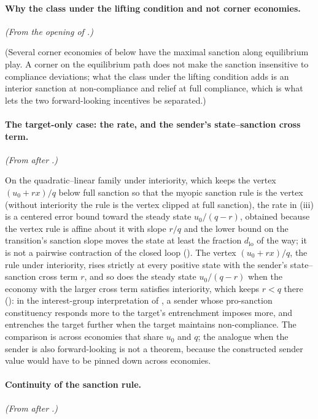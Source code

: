 \paragraph{Why the class under the lifting condition and not corner economies.} \emph{(From the opening of .)}

(Several corner economies of
 below have the maximal sanction along
equilibrium play. A corner on the equilibrium path does not make the
sanction insensitive to compliance deviations; what the class under the lifting condition adds
is an interior sanction at non-compliance and relief at full compliance,
which is what lets the two forward-looking incentives be separated.) 

\paragraph{The target-only case: the rate, and the sender's state--sanction cross term.} \emph{(From after .)}

On the quadratic--linear family under interiority, which keeps the vertex
$(u_0+rx)/q$ below full sanction so that the myopic sanction rule is the vertex (without
interiority the rule is the vertex clipped at full sanction), the rate in (iii)
is a centered error bound toward the steady state $u_0/(q-r)$, obtained because
the vertex rule is affine about it with slope $r/q$ and the lower
bound on the transition's sanction slope moves the state at least the fraction $d_{\mathrm{lo}}$ of the way; it
is not a pairwise contraction of the closed loop
(). The vertex $(u_0+rx)/q$, the rule under
interiority, rises strictly at every positive state with the sender's state--sanction
cross term $r$, and so does the steady state
$u_0/(q-r)$ when the economy with the larger cross term satisfies interiority, which
keeps $r<q$ there (): in the
interest-group interpretation of \citet{Kaempfer1988}, a sender whose pro-sanction
constituency responds more to the target's entrenchment imposes more, and
entrenches the target further when the target maintains non-compliance. The comparison is across
economies that share $u_0$ and $q$; the analogue when the sender is also
forward-looking is not a theorem, because the constructed sender value would have to be
pinned down across economies. 

\paragraph{Continuity of the sanction rule.} \emph{(From after .)}


